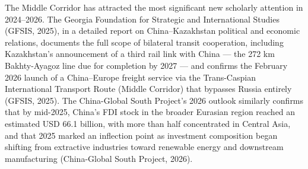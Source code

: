 \documentclass[12pt]{article}
\begin{document}
The Middle Corridor has attracted the most significant new scholarly attention in 2024--2026. The Georgia Foundation for Strategic and International Studies (GFSIS, 2025), in a detailed report on China--Kazakhstan political and economic relations, documents the full scope of bilateral transit cooperation, including Kazakhstan's announcement of a third rail link with China --- the 272 km Bakhty-Ayagoz line due for completion by 2027 --- and confirms the February 2026 launch of a China--Europe freight service via the Trans-Caspian International Transport Route (Middle Corridor) that bypasses Russia entirely (GFSIS, 2025). The China-Global South Project's 2026 outlook similarly confirms that by mid-2025, China's FDI stock in the broader Eurasian region reached an estimated USD 66.1 billion, with more than half concentrated in Central Asia, and that 2025 marked an inflection point as investment composition began shifting from extractive industries toward renewable energy and downstream manufacturing (China-Global South Project, 2026).\par
\end{document}
